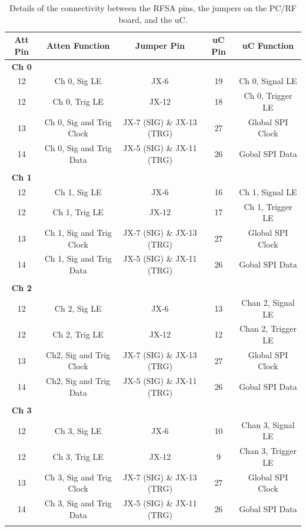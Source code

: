 \documentclass[letter,12pt]{article}
\begin{document}
\begin{table}
\begin{raggedright}
\begin{tabular}{|c|c|c|c|c|}
\hline 
Att Pin & Atten Function & Jumper Pin & uC Pin & uC Function\tabularnewline
\hline 
\hline 
\textbf{Ch 0} &  &  &  & \tabularnewline
\hline 
12 & Ch 0, Sig LE & JX-6 & 19 & Ch 0, Signal LE\tabularnewline
\hline 
12 & Ch 0, Trig LE & JX-12 & 18 & Ch 0, Trigger LE\tabularnewline
\hline 
13 & Ch 0, Sig and Trig Clock & JX-7 (SIG) \& JX-13 (TRG) & 27 & Global SPI Clock\tabularnewline
\hline 
14 & Ch 0, Sig and Trig Data & JX-5 (SIG) \& JX-11 (TRG) & 26 & Gobal SPI Data\tabularnewline
\hline 
 &  &  &  & \tabularnewline
\hline 
\textbf{Ch 1} &  &  &  & \tabularnewline
\hline 
12 & Ch 1, Sig LE & JX-6 & 16 & Ch 1, Signal LE\tabularnewline
\hline 
12 & Ch 1, Trig LE & JX-12 & 17 & Ch 1, Trigger LE\tabularnewline
\hline 
13 & Ch 1, Sig and Trig Clock & JX-7 (SIG) \& JX-13 (TRG) & 27 & Global SPI Clock\tabularnewline
\hline 
14 & Ch 1, Sig and Trig Data & JX-5 (SIG) \& JX-11 (TRG) & 26 & Gobal SPI Data\tabularnewline
\hline 
 &  &  &  & \tabularnewline
\textbf{Ch 2} &  &  &  & \tabularnewline
\hline 
12 & Ch 2, Sig LE & JX-6 & 13 & Chan 2, Signal LE\tabularnewline
\hline 
12 & Ch 2, Trig LE & JX-12 & 12 & Chan 2, Trigger LE\tabularnewline
\hline 
13 & Ch2, Sig and Trig Clock & JX-7 (SIG) \& JX-13 (TRG) & 27 & Global SPI Clock\tabularnewline
\hline 
14 & Ch2, Sig and Trig Data & JX-5 (SIG) \& JX-11 (TRG) & 26 & Gobal SPI Data\tabularnewline
\hline 
 &  &  &  & \tabularnewline
\hline 
\textbf{Ch 3} &  &  &  & \tabularnewline
\hline 
12 & Ch 3, Sig LE & JX-6 & 10 & Chan 3, Signal LE\tabularnewline
\hline 
12 & Ch 3, Trig LE & JX-12 & 9 & Chan 3, Trigger LE\tabularnewline
\hline 
13 & Ch 3, Sig and Trig Clock & JX-7 (SIG) \& JX-13 (TRG) & 27 & Global SPI Clock\tabularnewline
\hline 
14 & Ch 3, Sig and Trig Data & JX-5 (SIG) \& JX-11 (TRG) & 26 & Gobal SPI Data\tabularnewline
\hline 
 &  &  &  & \tabularnewline
\hline 
\end{tabular}
\par\end{raggedright}
\caption{Details of the connectivity between the RFSA pins, the jumpers on
the PC/RF board, and the uC.}
\label{PC-Jumper-RF-Mapping}
\end{table}
\end{document}
